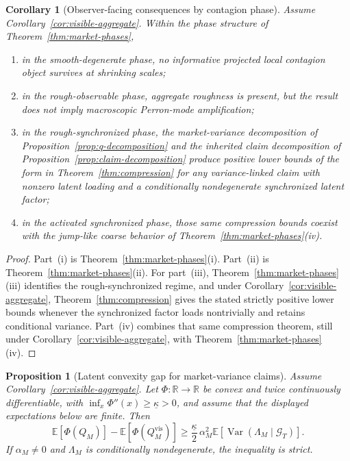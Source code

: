 \documentclass[11pt,a4paper]{amsart}
\theoremstyle{plain}
\newtheorem{proposition}[theorem]{Proposition}
\newtheorem{corollary}[theorem]{Corollary}
\theoremstyle{definition}
\theoremstyle{remark}
\DeclareMathOperator{\Var}{Var}
\newcommand{\R}{\mathbb{R}}
\newcommand{\EE}{\mathbb{E}}
\newcommand{\cG}{\mathcal{G}}
\begin{document}
\begin{corollary}[Observer-facing consequences by contagion phase]\label{cor:phase-observer}
Assume Corollary~\ref{cor:visible-aggregate}.  Within the phase structure of
Theorem~\ref{thm:market-phases},
\begin{enumerate}[label=(\roman*)]
\item in the smooth-degenerate phase, no informative projected local contagion object survives at
shrinking scales;
\item in the rough-observable phase, aggregate roughness is present, but the result does not imply
macroscopic Perron-mode amplification;
\item in the rough-synchronized phase, the market-variance decomposition of
Proposition~\ref{prop:q-decomposition} and the inherited claim decomposition of
Proposition~\ref{prop:claim-decomposition} produce positive lower bounds of the form in
Theorem~\ref{thm:compression} for any variance-linked claim with nonzero latent loading and a
conditionally nondegenerate synchronized latent factor;
\item in the activated synchronized phase, those same compression bounds coexist with the jump-like
coarse behavior of Theorem~\ref{thm:market-phases}(iv).
\end{enumerate}
\end{corollary}

\begin{proof}
Part~(i) is Theorem~\ref{thm:market-phases}(i).  Part~(ii) is
Theorem~\ref{thm:market-phases}(ii).  For part~(iii), Theorem~\ref{thm:market-phases}(iii)
identifies the rough-synchronized regime, and under Corollary~\ref{cor:visible-aggregate},
Theorem~\ref{thm:compression} gives the stated strictly positive lower bounds whenever the
synchronized factor loads nontrivially and retains conditional variance.  Part~(iv) combines that
same compression theorem, still under Corollary~\ref{cor:visible-aggregate}, with
Theorem~\ref{thm:market-phases}(iv).
\end{proof}

\begin{proposition}[Latent convexity gap for market-variance claims]\label{prop:convexity-gap}
Assume Corollary~\ref{cor:visible-aggregate}.  Let \(\Phi\colon\R\to\R\) be convex and
twice continuously differentiable, with \(\inf_x \Phi''(x)\ge \underline \kappa>0\), and assume
that the displayed expectations below are finite.  Then
\[
        \EE[\Phi(Q_M)]
        -
        \EE[\Phi(Q_M^{\mathrm{vis}})]
        \ge
        \frac{\underline\kappa}{2}\,
        \alpha_M^2
        \EE\!\left[\Var(\Lambda_M\mid \cG_T)\right].
\]
If \(\alpha_M\neq0\) and \(\Lambda_M\) is conditionally nondegenerate, the inequality is strict.
\end{proposition}
\end{document}
